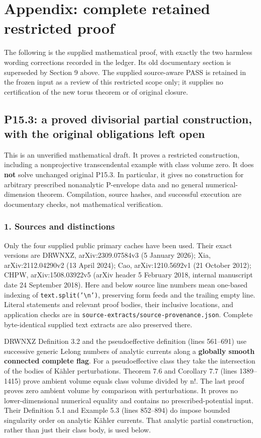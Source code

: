 \documentclass[11pt]{article}
\begin{document}
\section{Appendix: complete retained restricted proof}

The following is the supplied mathematical proof, with exactly the two harmless wording corrections recorded in the ledger. Its old documentary section is superseded by Section 9 above. The supplied source-\allowbreak{}aware PASS is retained in the frozen input as a review of this restricted scope only; it supplies no certification of the new torus theorem or of original closure.

\subsection{P15.3: a proved divisorial partial construction, with the original obligations left open}

This is an unverified mathematical draft. It proves a restricted construction, including a nonprojective transcendental example with class volume zero. It does \textbf{not} solve unchanged original P15.3. In particular, it gives no construction for arbitrary prescribed nonanalytic P-\allowbreak{}envelope data and no general numerical-\allowbreak{}dimension theorem. Compilation, source hashes, and successful execution are documentary checks, not mathematical verification.

\subsubsection{1. Sources and distinctions}

Only the four supplied public primary caches have been used. Their exact versions are DRWNXZ, arXiv:2309.07584v3 (5 January 2026); Xia, arXiv:2112.04290v2 (13 April 2024); Cao, arXiv:1210.5692v1 (21 October 2012); CHPW, arXiv:1508.03922v5 (arXiv header 5 February 2018, internal manuscript date 24 September 2018). Here and below source line numbers mean one-\allowbreak{}based indexing of \texttt{text.split('\textbackslash{}n')}, preserving form feeds and the trailing empty line. Literal statements and relevant proof bodies, their inclusive locations, and application checks are in \texttt{source-\allowbreak{}extracts/\allowbreak{}source-\allowbreak{}provenance.json}. Complete byte-\allowbreak{}identical supplied text extracts are also preserved there.

DRWNXZ Definition 3.2 and the pseudoeffective definition (lines 561–691) use successive generic Lelong numbers of analytic currents along a \textbf{globally smooth connected complete flag}. For a pseudoeffective class they take the intersection of the bodies of Kähler perturbations. Theorem 7.6 and Corollary 7.7 (lines 1389–1415) prove ambient volume equals class volume divided by n!. The last proof proves zero ambient volume by comparison with perturbations. It proves no lower-\allowbreak{}dimensional numerical equality and contains no prescribed-\allowbreak{}potential input. Their Definition 5.1 and Example 5.3 (lines 852–894) do impose bounded singularity order on analytic Kähler currents. That analytic partial construction, rather than just their class body, is used below.
\end{document}
